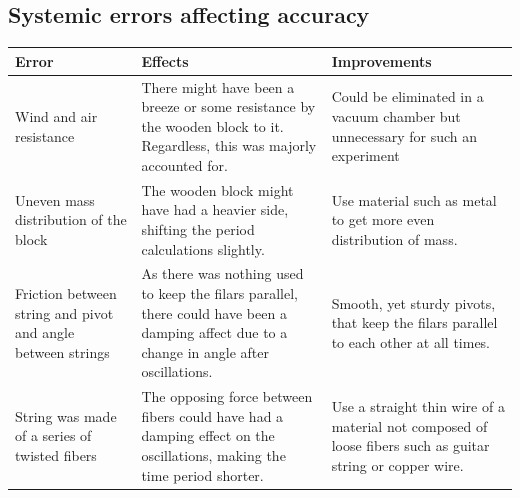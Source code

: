 \documentclass[a4paper,12pt]{article}
\theoremstyle{definition}
\begin{document}
\subsection{Systemic errors affecting accuracy}
\begin{table}[H]
\begin{tabular}{|p{3.4cm}|p{6.5cm}|p{5.5cm}|}
\hline
\textbf{Error}             & \textbf{Effects}                                                                                                          & \textbf{Improvements} \\ \hline
     Wind and air resistance                   &     There might have been a breeze or some resistance by the wooden block to it. Regardless, this was majorly accounted for.            &   Could be eliminated in a vacuum chamber but unnecessary for such an experiment   \\ \hline
         Uneven mass distribution of the block      & The wooden block might have had a heavier side, shifting the period calculations slightly. & Use material such as metal to get more even distribution of mass.          \\ \hline
                Friction between string and pivot and angle between strings         &    As there was nothing used to keep the filars parallel, there could have been a damping affect due to a change in angle after oscillations.                                                                                                  &   Smooth, yet sturdy pivots, that keep the filars parallel to each other at all times.           \\ \hline
   String was  made of a series of twisted fibers  &   The opposing force between fibers could have had a damping effect on the oscillations, making the time period shorter.                                                                                                                     &  Use a straight thin wire of a material not composed of loose fibers such as guitar string or copper wire. \\ \hline
\end{tabular}
\end{table}
\end{document}
